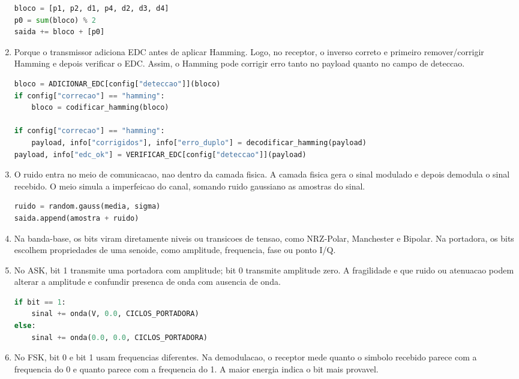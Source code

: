 \documentclass[12pt,a4paper]{article}
\begin{document}
\begin{enumerate}
  \begin{lstlisting}[language=Python]
bloco = [p1, p2, d1, p4, d2, d3, d4]
p0 = sum(bloco) % 2
saida += bloco + [p0]
  \end{lstlisting}

  \item Porque o transmissor adiciona EDC antes de aplicar Hamming. Logo, no receptor, o inverso correto e primeiro remover/corrigir Hamming e depois verificar o EDC. Assim, o Hamming pode corrigir erro tanto no payload quanto no campo de deteccao.

  \begin{lstlisting}[language=Python]
bloco = ADICIONAR_EDC[config["deteccao"]](bloco)
if config["correcao"] == "hamming":
    bloco = codificar_hamming(bloco)

if config["correcao"] == "hamming":
    payload, info["corrigidos"], info["erro_duplo"] = decodificar_hamming(payload)
payload, info["edc_ok"] = VERIFICAR_EDC[config["deteccao"]](payload)
  \end{lstlisting}

  \item O ruido entra no meio de comunicacao, nao dentro da camada fisica. A camada fisica gera o sinal modulado e depois demodula o sinal recebido. O meio simula a imperfeicao do canal, somando ruido gaussiano as amostras do sinal.

  \begin{lstlisting}[language=Python]
ruido = random.gauss(media, sigma)
saida.append(amostra + ruido)
  \end{lstlisting}

  \item Na banda-base, os bits viram diretamente niveis ou transicoes de tensao, como NRZ-Polar, Manchester e Bipolar. Na portadora, os bits escolhem propriedades de uma senoide, como amplitude, frequencia, fase ou ponto I/Q.

  \item No ASK, bit 1 transmite uma portadora com amplitude; bit 0 transmite amplitude zero. A fragilidade e que ruido ou atenuacao podem alterar a amplitude e confundir presenca de onda com ausencia de onda.

  \begin{lstlisting}[language=Python]
if bit == 1:
    sinal += onda(V, 0.0, CICLOS_PORTADORA)
else:
    sinal += onda(0.0, 0.0, CICLOS_PORTADORA)
  \end{lstlisting}

  \item No FSK, bit 0 e bit 1 usam frequencias diferentes. Na demodulacao, o receptor mede quanto o simbolo recebido parece com a frequencia do 0 e quanto parece com a frequencia do 1. A maior energia indica o bit mais provavel.


\end{enumerate}
\end{document}
